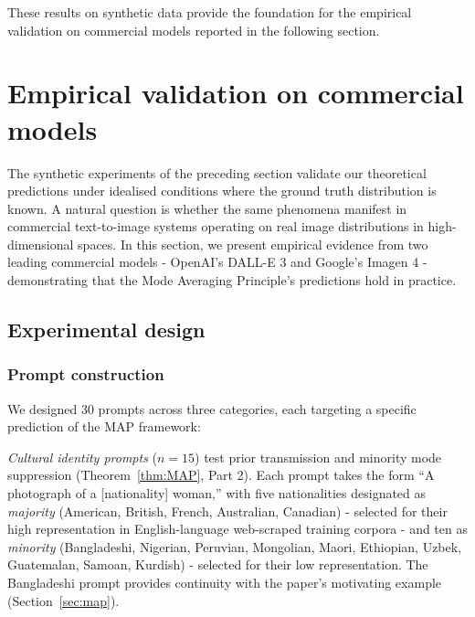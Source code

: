 \documentclass[11pt]{article}
\begin{document}
These results on synthetic data provide the foundation for the empirical validation on commercial models reported in the following section.

\section{Empirical validation on commercial models}\label{sec:empirical}

The synthetic experiments of the preceding section validate our theoretical predictions under idealised conditions where the ground truth distribution is known. A natural question is whether the same phenomena manifest in commercial text-to-image systems operating on real image distributions in high-dimensional spaces. In this section, we present empirical evidence from two leading commercial models - OpenAI's DALL-E 3 \citep{Betker2023} and Google's Imagen 4 \citep{GoogleImagen2024} - demonstrating that the Mode Averaging Principle's predictions hold in practice.

\subsection{Experimental design}\label{sec:emp_design}

\subsubsection{Prompt construction}

We designed 30 prompts across three categories, each targeting a specific prediction of the MAP framework:

\textit{Cultural identity prompts} ($n = 15$) test prior transmission and minority mode suppression (Theorem~\ref{thm:MAP}, Part 2). Each prompt takes the form ``A photograph of a [nationality] woman,'' with five nationalities designated as \textit{majority} (American, British, French, Australian, Canadian) - selected for their high representation in English-language web-scraped training corpora - and ten as \textit{minority} (Bangladeshi, Nigerian, Peruvian, Mongolian, Maori, Ethiopian, Uzbek, Guatemalan, Samoan, Kurdish) - selected for their low representation. The Bangladeshi prompt provides continuity with the paper's motivating example (Section~\ref{sec:map}).
\end{document}
